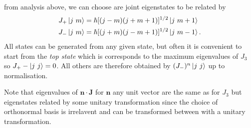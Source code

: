 \documentclass{article}
\begin{document}
from analysis above, we can choose are joint eigenstates to be related by 
\begin{align*}
	J_+ \ket{j\ m} &= \hbar [(j-m)(j+m+1)]^{1/2}\ket{j\ m+1}\\
	J_- \ket{j\ m} &= \hbar[(j+m)(j-m+1)]^{1/2}\ket{j\ m - 1}.
\end{align*}
All states can be generated from any given state, but often it is convenient to start from the \textit{top state} which is corresponds to the maximum eigenvalues of $ J_3 $ so $ J_+-\ket{j\ j} = 0 $. All others are therefore obtained by $ (J_-)^n\ket{j\ j} $ up to normalisation.\par
Note that eigenvalues of $ \mathbf n \cdot \mathbf J $ for $ \mathbf n $ any unit vector are the same as for $ J_3 $ but eigenstates related by some unitary transformation since the choice of orthonormal basis is irrelavent and can be transformed between with a unitary transformation.
\end{document}
